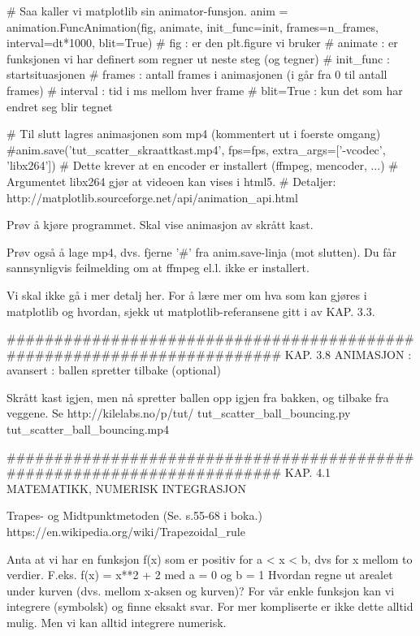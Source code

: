 \documentclass[a4paper,11pt,utf8]{book}
\begin{document}
# Saa kaller vi matplotlib sin animator-funsjon.  
anim = animation.FuncAnimation(fig, animate, init_func=init, frames=n_frames, interval=dt*1000, blit=True)
# fig       : er den plt.figure vi bruker
# animate   : er funksjonen vi har definert som regner ut neste steg (og tegner)
# init_func : startsituasjonen
# frames    : antall frames i animasjonen (i går fra 0 til antall frames)
# interval  : tid i ms mellom hver frame 
# blit=True : kun det som har endret seg blir tegnet 


# Til slutt lagres animasjonen som mp4 (kommentert ut i foerste omgang)
#anim.save('tut_scatter_skraattkast.mp4', fps=fps, extra_args=['-vcodec', 'libx264'])
# Dette krever at en encoder er installert (ffmpeg, mencoder, ...)
# Argumentet libx264 gjør at videoen kan vises i html5. 
# Detaljer:  http://matplotlib.sourceforge.net/api/animation_api.html




Prøv å kjøre programmet. 
Skal vise animasjon av skrått kast. 

Prøv også å lage mp4, dvs. fjerne '#' fra anim.save-linja (mot slutten).
Du får sannsynligvis feilmelding om at ffmpeg el.l. ikke er installert. 

Vi skal ikke gå i mer detalj her.
For å lære mer om hva som kan gjøres i matplotlib og hvordan,
sjekk ut matplotlib-referansene gitt i av KAP. 3.3. 



######################################################################## 
KAP. 3.8  ANIMASJON : avansert : ballen spretter tilbake  (optional)

Skrått kast igjen, men nå spretter ballen opp igjen fra bakken,
og tilbake fra veggene.
Se http://kilelabs.no/p/tut/
tut_scatter_ball_bouncing.py 
tut_scatter_ball_bouncing.mp4



######################################################################## 
KAP. 4.1  MATEMATIKK, NUMERISK INTEGRASJON

Trapes- og Midtpunktmetoden
(Se. s.55-68 i boka.) 
https://en.wikipedia.org/wiki/Trapezoidal_rule 

Anta at vi har en funksjon f(x) som er positiv for a < x < b, dvs for x mellom to verdier.
F.eks. f(x) = x**2 + 2 med a = 0 og b = 1
Hvordan regne ut arealet under kurven (dvs. mellom x-aksen og kurven)?
For vår enkle funksjon kan vi integrere (symbolsk) og finne eksakt svar.
For mer kompliserte er ikke dette alltid mulig. 
Men vi kan alltid integrere numerisk. 
\end{document}
